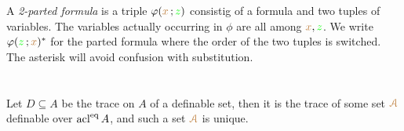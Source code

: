 \documentclass[creche.tex]{subfiles}
\begin{document}
\begin{definition}\label{def_parted-fla}
A \emph{2-parted formula\/} is a triple $\varphi({\color{brown} x}\,;{\color{green} z})$ consistig of a formula and two tuples of variables. The variables actually occurring in $\phi$ are all among ${\color{brown} x},{\color{green} z}$. We write $\varphi({\color{green} z}\,;{\color{brown} x})^*$ for the parted formula where the order of the two tuples is switched. The asterisk will avoid confusion with substitution.
\end{definition}

\section{}


Let $D\subseteq A$ be the trace on $A$ of a definable set, then it is the trace of some set ${\color{brown}{\EuScript A}}$ definable over $\mathop{\rm acl}^{{\rm eq}} A$, and such a set ${\color{brown}{\EuScript A}}$ is unique.
\end{document}
